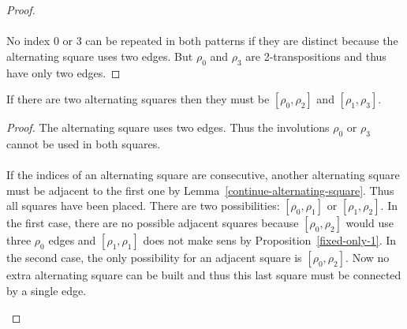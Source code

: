 \begin{proof}
  \paragraph{}
  No index 0 or 3 can be repeated in both patterns if they are distinct because the alternating square uses two edges. But $\rho_0$ and $\rho_3$ are 2-transpositions and thus have only two edges.

\end{proof}

\begin{lemma}
  If there are two alternating squares then they must be $[\rho_0, \rho_2]$ and $[\rho_1, \rho_3]$.
\end{lemma}

\begin{proof}
  The alternating square uses two edges. Thus the involutions $\rho_0$ or $\rho_3$ cannot be used in both squares.

  \paragraph{}
  If the indices of an alternating square are consecutive, another alternating square must be adjacent to the first one by Lemma~\ref{continue-alternating-square}. Thus all squares have been placed. There are two possibilities: $[\rho_0, \rho_1]$ or $[\rho_1, \rho_2]$. In the first case, there are no possible adjacent squares because $[\rho_0, \rho_2]$ would use three $\rho_0$ edges and $[\rho_1, \rho_1]$ does not make sens by Proposition~\ref{fixed-only-1}. In the second case, the only possibility for an adjacent square is $[\rho_0, \rho_2]$. Now no extra alternating square can be built and thus this last square must be connected by a single edge.

  \begin{figure}[H]
    \begin{center}
\end{center}
\end{figure}
\end{proof}

